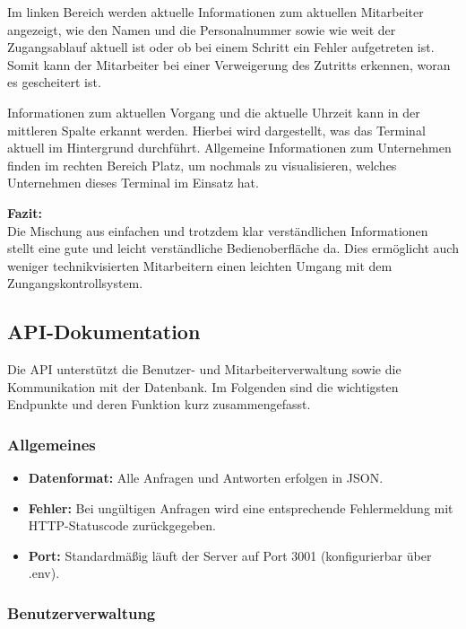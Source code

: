 \vspace{1em}
\noindent Im linken Bereich werden aktuelle Informationen zum aktuellen Mitarbeiter angezeigt, wie den Namen und die Personalnummer sowie wie weit der Zugangsablauf aktuell ist oder ob bei einem Schritt ein Fehler aufgetreten ist. Somit kann der Mitarbeiter bei einer Verweigerung des Zutritts erkennen, woran es gescheitert ist.

\vspace{1em}
\noindent Informationen zum aktuellen Vorgang und die aktuelle Uhrzeit kann in der mittleren Spalte erkannt werden. Hierbei wird dargestellt, was das Terminal aktuell im Hintergrund durchführt.
Allgemeine Informationen zum Unternehmen finden im rechten Bereich Platz, um nochmals zu visualisieren, welches Unternehmen dieses Terminal im Einsatz hat.

\vspace{1em}
\noindent \textbf{Fazit: }\\
Die Mischung aus einfachen und trotzdem klar verständlichen Informationen stellt eine gute und leicht verständliche Bedienoberfläche da. Dies ermöglicht auch weniger technikvisierten Mitarbeitern einen leichten Umgang mit dem Zungangskontrollsystem.

\subsection{API-Dokumentation}\label{subsec:api-dokumentation}

Die API unterstützt die Benutzer- und Mitarbeiterverwaltung sowie die Kommunikation mit der Datenbank. Im Folgenden sind die wichtigsten Endpunkte und deren Funktion kurz zusammengefasst.


\subsubsection{Allgemeines}

\begin{itemize}
    \item \textbf{Datenformat: }Alle Anfragen und Antworten erfolgen in JSON.
    \item \textbf{Fehler: }Bei ungültigen Anfragen wird eine entsprechende Fehlermeldung mit HTTP-Statuscode zurückgegeben.
    \item \textbf{Port: }Standardmäßig läuft der Server auf Port 3001 (konfigurierbar über .env).
\end{itemize}


\subsubsection{Benutzerverwaltung}

